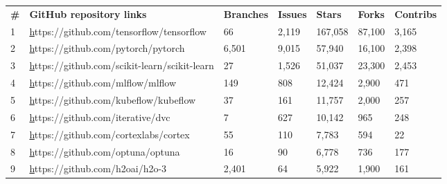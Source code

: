 \documentclass{article}
\begin{document}
\begin{table}[ht]
\centering
\begin{tabular}{lllllll}
\textbf{\#} & \textbf{GitHub   repository links}                                            & \textbf{Branches} & \textbf{Issues} & \textbf{Stars} & \textbf{Forks} & \textbf{Contribs} \\
1           & {\color[HTML]{0563C1} {\ul https://github.com/tensorflow/tensorflow}}         & 66                & 2,119           & 167,058        & 87,100         & 3,165             \\
2           & {\color[HTML]{0563C1} {\ul https://github.com/pytorch/pytorch}}               & 6,501             & 9,015           & 57,940         & 16,100         & 2,398             \\
3           & {\color[HTML]{0563C1} {\ul https://github.com/scikit-learn/scikit-learn}}     & 27                & 1,526           & 51,037         & 23,300         & 2,453             \\
4           & {\color[HTML]{0563C1} {\ul https://github.com/mlflow/mlflow}}                 & 149               & 808             & 12,424         & 2,900          & 471               \\
5           & {\color[HTML]{0563C1} {\ul https://github.com/kubeflow/kubeflow}}             & 37                & 161             & 11,757         & 2,000          & 257               \\
6           & {\color[HTML]{0563C1} {\ul https://github.com/iterative/dvc}}                 & 7                 & 627             & 10,142         & 965            & 248               \\
7           & {\color[HTML]{0563C1} {\ul https://github.com/cortexlabs/cortex}}             & 55                & 110             & 7,783          & 594            & 22                \\
8           & {\color[HTML]{0563C1} {\ul https://github.com/optuna/optuna}}                 & 16                & 90              & 6,778          & 736            & 177               \\
9           & {\color[HTML]{0563C1} {\ul https://github.com/h2oai/h2o-3}}                   & 2,401             & 64                & 5,922          & 1,900          & 161               \\

\end{tabular}
\end{table}
\end{document}
